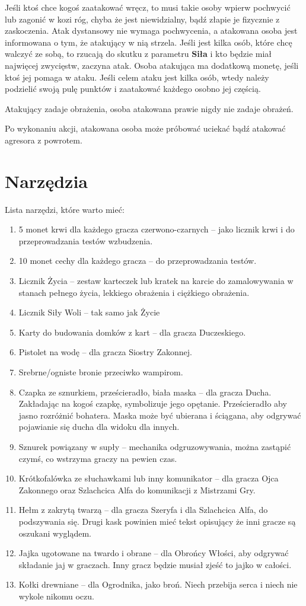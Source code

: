 	Jeśli ktoś chce kogoś zaatakować wręcz, to musi takie osoby wpierw pochwycić lub zagonić w kozi róg, chyba że jest niewidzialny, bądź złapie je fizycznie z zaskoczenia.
	Atak dystansowy nie wymaga pochwycenia, a atakowana osoba jest informowana o tym, że atakujący w nią strzela.
	Jeśli jest kilka osób, które chcę walczyć ze sobą, to rzucają do skutku z parametru \textbf{Siła} i kto będzie miał najwięcej zwycięstw, zaczyna atak.
	Osoba atakująca ma dodatkową monetę, jeśli ktoś jej pomaga w ataku.
	Jeśli celem ataku jest kilka osób, wtedy należy podzielić swoją pulę punktów i zaatakować każdego osobno jej częścią.
	
	Atakujący zadaje obrażenia, osoba atakowana prawie nigdy nie zadaje obrażeń.
	
	Po wykonaniu akcji, atakowana osoba może próbować uciekać bądź atakować agresora z powrotem.

\section{Narzędzia}
	Lista narzędzi, które warto mieć:
	\begin{enumerate}
		\item 5 monet krwi dla każdego gracza czerwono-czarnych -- jako licznik krwi i do przeprowadzania testów wzbudzenia.
		\item 10 monet cechy dla każdego gracza -- do przeprowadzania testów.
		\item Licznik Życia -- zestaw karteczek lub kratek na karcie do zamalowywania w stanach pełnego życia, lekkiego obrażenia i ciężkiego obrażenia.
		\item Licznik Siły Woli -- tak samo jak Życie
		\item Karty do budowania domków z kart -- dla gracza Duczeskiego.
		\item Pistolet na wodę -- dla gracza Siostry Zakonnej.
		\item Srebrne/ogniste bronie przeciwko wampirom.
		\item Czapka ze sznurkiem, prześcieradło, biała maska -- dla gracza Ducha. Zakładając na kogoś czapkę, symbolizuje jego opętanie.
			Prześcieradło aby jasno rozróżnić bohatera. Maska może być ubierana i ściągana, aby odgrywać pojawianie się ducha dla widoku dla innych.
		\item Sznurek powiązany w supły -- mechanika odgruzowywania, można zastąpić czymś, co wstrzyma graczy na pewien czas.
		\item Krótkofalówka ze słuchawkami lub inny komunikator -- dla gracza Ojca Zakonnego oraz Szlachcica Alfa do komunikacji z Mistrzami Gry.
		\item Hełm z zakrytą twarzą -- dla gracza Szeryfa i dla Szlachcica Alfa, do podszywania się.
			Drugi kask powinien mieć tekst opisujący że inni gracze są oszukani wyglądem.
		\item Jajka ugotowane na twardo i obrane -- dla Obrońcy Włości, aby odgrywać składanie jaj w graczach. Inny gracz będzie musiał zjeść to jajko w całości.
		\item Kołki drewniane -- dla Ogrodnika, jako broń. Niech przebija serca i niech nie wykole nikomu oczu.
	\end{enumerate}
	
